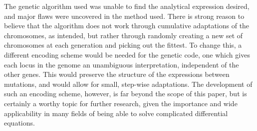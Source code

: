 \documentclass[multicolumn, 12pt]{extarticle}
\begin{document}
The genetic algorithm used was unable to find the analytical expression desired, and major flaws were uncovered in the method used. There is strong reason to believe that the algorithm does not work through cumulative adaptations of the chromosomes, as intended, but rather through randomly creating a new set of chromosomes at each generation and picking out the fittest. To change this, a different encoding scheme would be needed for the genetic code, one which gives each locus in the genome an unambiguous interpretation, independent of the other genes. This would preserve the structure of the expressions between mutations, and would allow for small, step-wise adaptations. The development of such an encoding scheme, however, is far beyond the scope of this paper, but is certainly a worthy topic for further research, given the importance and wide applicability in many fields of being able to solve complicated differential equations. 




\end{document}
